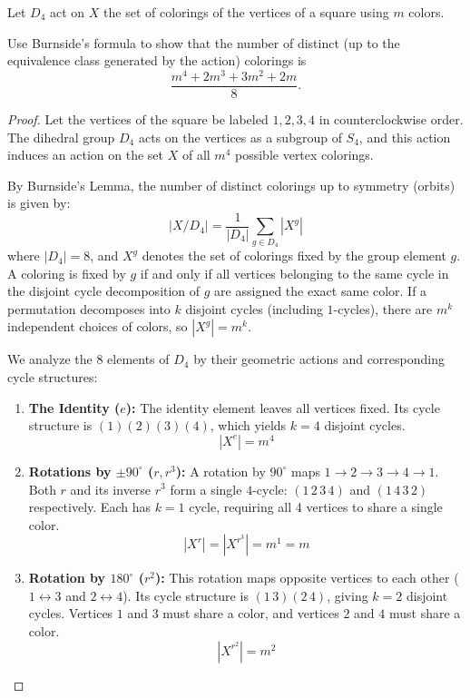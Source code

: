 \begin{prob}
    Let $D_4$ act on $X$ the set of colorings 
    of the vertices of a square using $m$ colors.   

    Use Burnside's formula to show that the number of 
    distinct (up to the equivalence class generated by 
    the action) colorings is 
    \[
        \frac{m^4 + 2m^3 + 3m^2 + 2m}{8}.
    \]
\end{prob}
\begin{proof}
Let the vertices of the square be labeled $1, 2, 3, 4$ in counterclockwise order. The dihedral group $D_4$ acts on the vertices as a subgroup of $S_4$, and this action induces an action on the set $X$ of all $m^4$ possible vertex colorings. 

By Burnside's Lemma, the number of distinct colorings up to symmetry (orbits) is given by:
\[
|X/D_4| = \frac{1}{|D_4|} \sum_{g \in D_4} |X^g|
\]
where $|D_4| = 8$, and $X^g$ denotes the set of colorings fixed by the group element $g$. A coloring is fixed by $g$ if and only if all vertices belonging to the same cycle in the disjoint cycle decomposition of $g$ are assigned the exact same color. If a permutation decomposes into $k$ disjoint cycles (including $1$-cycles), there are $m^k$ independent choices of colors, so $|X^g| = m^k$.

We analyze the $8$ elements of $D_4$ by their geometric actions and corresponding cycle structures:

\begin{enumerate}
    \item \textbf{The Identity ($e$):} 
    The identity element leaves all vertices fixed. Its cycle structure is $(1)(2)(3)(4)$, which yields $k = 4$ disjoint cycles. 
    \[ |X^e| = m^4 \]

    \item \textbf{Rotations by $\pm 90^\circ$ ($r, r^3$):} 
    A rotation by $90^\circ$ maps $1 \to 2 \to 3 \to 4 \to 1$. Both $r$ and its inverse $r^3$ form a single $4$-cycle: $(1\,2\,3\,4)$ and $(1\,4\,3\,2)$ respectively. Each has $k = 1$ cycle, requiring all 4 vertices to share a single color.
    \[ |X^r| = |X^{r^3}| = m^1 = m \]

    \item \textbf{Rotation by $180^\circ$ ($r^2$):} 
    This rotation maps opposite vertices to each other ($1 \leftrightarrow 3$ and $2 \leftrightarrow 4$). Its cycle structure is $(1\,3)(2\,4)$, giving $k = 2$ disjoint cycles. Vertices $1$ and $3$ must share a color, and vertices $2$ and $4$ must share a color.
    \[ |X^{r^2}| = m^2 \]


\end{enumerate}
\end{proof}
